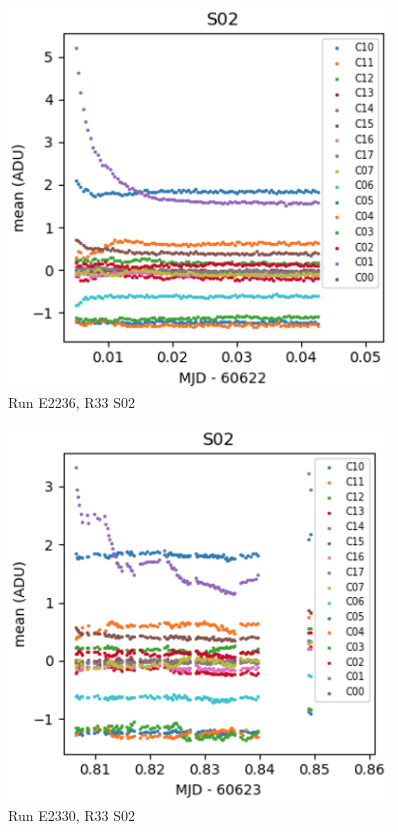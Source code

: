 \begin{figure}
\begin{centering}
\includegraphics[width=0.9\textwidth]{sections/figures/E2236_R33_S02.png}
\end{centering}
\caption{Run E2236, R33 S02}
\end{figure}

\begin{figure}
\begin{centering}
\includegraphics[width=0.9\textwidth]{sections/figures/E2330_R33_S02.png}
\end{centering}
\caption{Run E2330, R33 S02}
\end{figure}

